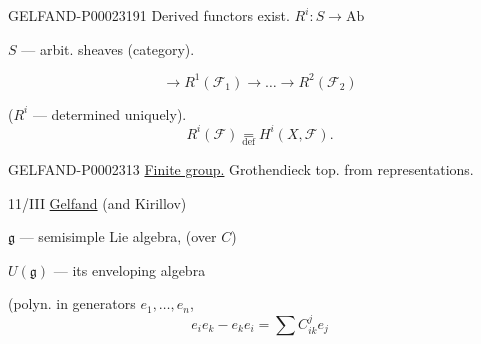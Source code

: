 \begin{GelfandAdjacentEvidence}{GELFAND-P000231}{91}
Derived functors exist. $R^i: S\to\mathrm{Ab}$



$S$ — arbit. sheaves (category).



\begin{equation*}
 \to R^1(\mathcal F_1)\to\ldots\to R^2(\mathcal F_2)
\end{equation*}



($R^i$ — determined uniquely).
\begin{equation*}
 R^i (\mathcal F)\underset{\mathrm{def}}{=}H^i (X,\mathcal F).
\end{equation*}




\end{GelfandAdjacentEvidence}\begin{GelfandAdjacentEvidence}{GELFAND-P000231}{3}
\underline{Finite group.} Grothendieck top. from representations.







\end{GelfandAdjacentEvidence}



11/III \underline{Gelfand} (and Kirillov)



$\mathfrak g$ — semisimple Lie algebra, (over $C$)



$U (\mathfrak g)$ — its enveloping algebra



(polyn. in generators $e_1,\ldots, e_n$,
\begin{equation*}
 e_i e_k-e_k e_i=\sum C^j_{ik}e_j
\end{equation*}




